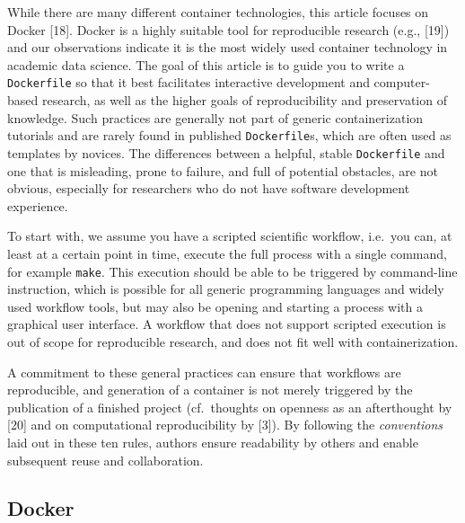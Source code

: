 \documentclass[10pt,letterpaper]{article}
\begin{document}
While there are many different container technologies, this article
focuses on Docker {[}18{]}. Docker is a highly suitable tool for
reproducible research (e.g., {[}19{]}) and our observations indicate it
is the most widely used container technology in academic data science.
The goal of this article is to guide you to write a \texttt{Dockerfile}
so that it best facilitates interactive development and computer-based
research, as well as the higher goals of reproducibility and
preservation of knowledge. Such practices are generally not part of
generic containerization tutorials and are rarely found in published
\texttt{Dockerfile}s, which are often used as templates by novices. The
differences between a helpful, stable \texttt{Dockerfile} and one that
is misleading, prone to failure, and full of potential obstacles, are
not obvious, especially for researchers who do not have software
development experience.

To start with, we assume you have a scripted scientific workflow,
i.e.~you can, at least at a certain point in time, execute the full
process with a single command, for example \texttt{make}. This execution
should be able to be triggered by command-line instruction, which is
possible for all generic programming languages and widely used workflow
tools, but may also be opening and starting a process with a graphical
user interface. A workflow that does not support scripted execution is
out of scope for reproducible research, and does not fit well with
containerization.

A commitment to these general practices can ensure that workflows are
reproducible, and generation of a container is not merely triggered by
the publication of a finished project (cf.~thoughts on openness as an
afterthought by {[}20{]} and on computational reproducibility by
{[}3{]}). By following the \emph{conventions} laid out in these ten
rules, authors ensure readability by others and enable subsequent reuse
and collaboration.

\hypertarget{docker}{%
\subsection*{Docker}\label{docker}}
\end{document}
